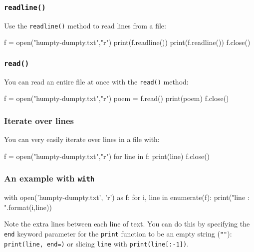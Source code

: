 \documentclass[12pt]{article} \newif\ifsolution\solutiontrue %
\begin{document}
\subsubsection{\texorpdfstring{\texttt{readline()}}{readline()}}\label{readline}

Use the \texttt{readline()} method to read lines from a file:

\begin{python}
f = open("humpty-dumpty.txt","r") print(f.readline()) print(f.readline()) f.close()
\end{python}

\subsubsection{\texorpdfstring{\texttt{read()}}{read()}}\label{read}

You can read an entire file at once with the \texttt{read()} method:

\begin{python}
f = open("humpty-dumpty.txt","r") poem = f.read() print(poem) f.close()
\end{python}

\subsubsection{Iterate over lines}\label{iterate-over-lines}

You can very easily iterate over lines in a file with:

\begin{python}
f = open("humpty-dumpty.txt","r") for line in f:     print(line) f.close()
\end{python}

\subsubsection{\texorpdfstring{An example with
\texttt{with}}{An example with with}}\label{an-example-with-with}

\begin{python}
with open('humpty-dumpty.txt', 'r') as f:     for i, line in enumerate(f):         print("line {}: {}".format(i,line))
\end{python}

Note the extra lines between each line of text. You can do this by
specifying the \texttt{end} keyword parameter for the \texttt{print}
function to be an empty string (\texttt{""}):
\texttt{print(line,\ end=\textquotesingle{}\textquotesingle{})} or
slicing \texttt{line} with \texttt{print(line{[}:-1{]})}.
\end{document}
